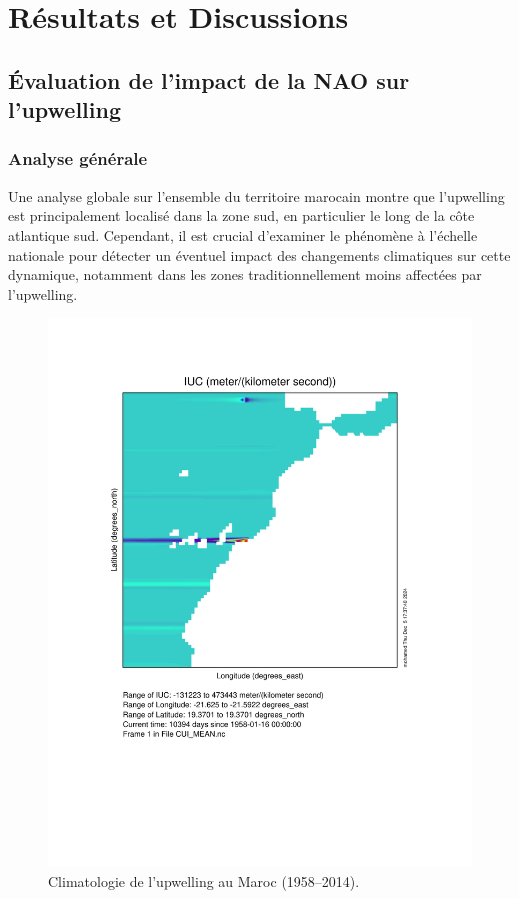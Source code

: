 \section{Résultats et Discussions}

\subsection{Évaluation de l'impact de la NAO sur l'upwelling}
\subsubsection{Analyse générale}
Une analyse globale sur l’ensemble du territoire marocain montre que l’upwelling est principalement localisé dans la zone sud, en particulier le long de la côte atlantique sud. Cependant, il est crucial d'examiner le phénomène à l'échelle nationale pour détecter un éventuel impact des changements climatiques sur cette dynamique, notamment dans les zones traditionnellement moins affectées par l'upwelling.

\begin{figure}[H]
\centering
\includegraphics[scale=0.5]{ncview_output.pdf}
\caption{Climatologie de l'upwelling au Maroc (1958–2014).}
\label{fig:climatologie_upwelling}
\end{figure}

